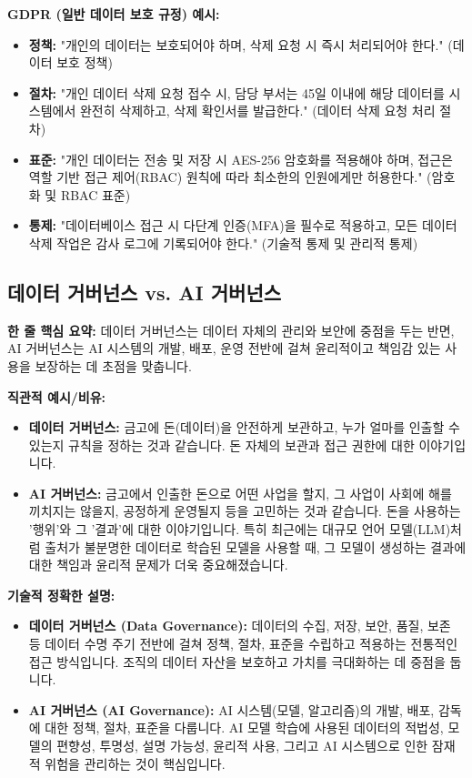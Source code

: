 \documentclass[11pt,a4paper]{article}
\begin{document}
\begin{examplebox}
\textbf{GDPR (일반 데이터 보호 규정) 예시:}
\begin{itemize}
    \item \textbf{정책:} "개인의 데이터는 보호되어야 하며, 삭제 요청 시 즉시 처리되어야 한다." (데이터 보호 정책)
    \item \textbf{절차:} "개인 데이터 삭제 요청 접수 시, 담당 부서는 45일 이내에 해당 데이터를 시스템에서 완전히 삭제하고, 삭제 확인서를 발급한다." (데이터 삭제 요청 처리 절차)
    \item \textbf{표준:} "개인 데이터는 전송 및 저장 시 AES-256 암호화를 적용해야 하며, 접근은 역할 기반 접근 제어(RBAC) 원칙에 따라 최소한의 인원에게만 허용한다." (암호화 및 RBAC 표준)
    \item \textbf{통제:} "데이터베이스 접근 시 다단계 인증(MFA)을 필수로 적용하고, 모든 데이터 삭제 작업은 감사 로그에 기록되어야 한다." (기술적 통제 및 관리적 통제)
\end{itemize}
\end{examplebox}

\newpage
\subsection*{데이터 거버넌스 vs. AI 거버넌스}

\begin{keyconceptbox}
\textbf{한 줄 핵심 요약:} 데이터 거버넌스는 데이터 자체의 관리와 보안에 중점을 두는 반면, AI 거버넌스는 AI 시스템의 개발, 배포, 운영 전반에 걸쳐 윤리적이고 책임감 있는 사용을 보장하는 데 초점을 맞춥니다.
\end{keyconceptbox}

\textbf{직관적 예시/비유:}
\begin{itemize}
    \item \textbf{데이터 거버넌스:} 금고에 돈(데이터)을 안전하게 보관하고, 누가 얼마를 인출할 수 있는지 규칙을 정하는 것과 같습니다. 돈 자체의 보관과 접근 권한에 대한 이야기입니다.
    \item \textbf{AI 거버넌스:} 금고에서 인출한 돈으로 어떤 사업을 할지, 그 사업이 사회에 해를 끼치지는 않을지, 공정하게 운영될지 등을 고민하는 것과 같습니다. 돈을 사용하는 '행위'와 그 '결과'에 대한 이야기입니다. 특히 최근에는 대규모 언어 모델(LLM)처럼 출처가 불분명한 데이터로 학습된 모델을 사용할 때, 그 모델이 생성하는 결과에 대한 책임과 윤리적 문제가 더욱 중요해졌습니다.
\end{itemize}

\textbf{기술적 정확한 설명:}
\begin{itemize}
    \item \textbf{데이터 거버넌스 (Data Governance):} 데이터의 수집, 저장, 보안, 품질, 보존 등 데이터 수명 주기 전반에 걸쳐 정책, 절차, 표준을 수립하고 적용하는 전통적인 접근 방식입니다. 조직의 데이터 자산을 보호하고 가치를 극대화하는 데 중점을 둡니다.
    \item \textbf{AI 거버넌스 (AI Governance):} AI 시스템(모델, 알고리즘)의 개발, 배포, 감독에 대한 정책, 절차, 표준을 다룹니다. AI 모델 학습에 사용된 데이터의 적법성, 모델의 편향성, 투명성, 설명 가능성, 윤리적 사용, 그리고 AI 시스템으로 인한 잠재적 위험을 관리하는 것이 핵심입니다.
\end{itemize}
\end{document}
